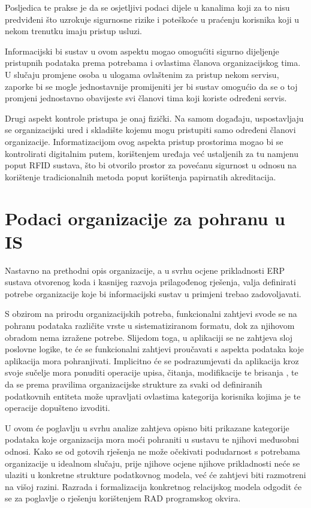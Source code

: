 \documentclass[times, utf8, diplomski]{fer}
\begin{document}
Posljedica te prakse je da se osjetljivi podaci dijele u kanalima koji za to
nisu predviđeni što uzrokuje sigurnosne rizike i poteškoće u praćenju korisnika
koji u nekom trenutku imaju pristup usluzi.

Informacijski bi sustav u ovom aspektu mogao omogućiti sigurno dijeljenje
pristupnih podataka prema potrebama i ovlastima članova organizacijskog tima. U
slučaju promjene osoba u ulogama ovlaštenim za pristup nekom servisu, zaporke bi
se mogle jednostavnije promijeniti jer bi sustav omogućio da se o toj promjeni
jednostavno obavijeste svi članovi tima koji koriste određeni servis.

Drugi aspekt kontrole pristupa je onaj fizički. Na samom događaju, uspostavljaju
se organizacijski ured i skladište kojemu mogu pristupiti samo određeni članovi
organizacije. Informatizacijom ovog aspekta pristup prostorima mogao bi se
kontrolirati digitalnim putem, korištenjem uređaja već ustaljenih za tu namjenu
poput RFID sustava, što bi otvorilo prostor za povećanu sigurnost u odnosu na
korištenje tradicionalnih metoda poput korištenja papirnatih akreditacija.

\chapter{Podaci organizacije za pohranu u IS}

Nastavno na prethodni opis organizacije, a u svrhu ocjene prikladnosti ERP
sustava otvorenog koda i kasnijeg razvoja prilagođenog rješenja, valja
definirati potrebe organizacije koje bi informacijski sustav u primjeni trebao
zadovoljavati.

S obzirom na prirodu organizacijskih potreba, funkcionalni zahtjevi svode se na
pohranu podataka različite vrste u sistematiziranom formatu, dok za njihovom
obradom nema izražene potrebe. Slijedom toga, u aplikaciji se ne zahtjeva sloj
poslovne logike, te će se funkcionalni zahtjevi proučavati s aspekta podataka
koje aplikacija mora pohranjivati. Implicitno će se podrazumjevati da aplikacija
kroz svoje sučelje mora ponuditi operacije upisa, čitanja, modifikacije te
brisanja , te da se prema pravilima organizacijske strukture za svaki
od definiranih podatkovnih entiteta može upravljati ovlastima kategorija
korisnika kojima je te operacije dopušteno izvoditi.

U ovom će poglavlju u svrhu analize zahtjeva opisno biti prikazane kategorije
podataka koje organizacija mora moći pohraniti u sustavu te njihovi međusobni
odnosi. Kako se od gotovih rješenja ne može očekivati podudarnost s potrebama
organizacije u idealnom slučaju, prije njihove ocjene njihove prikladnosti neće
se ulaziti u konkretne strukture podatkovnog modela, već će zahtjevi biti
razmotreni na višoj razini. Razrada i formalizacija konkretnog relacijskog
modela odgodit će se za poglavlje o rješenju korištenjem RAD programskog okvira.
\end{document}
